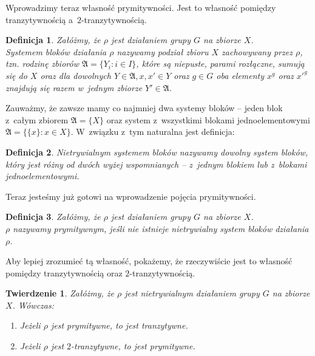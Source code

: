 \documentclass[licencjacka]{pracamgr}
\newtheorem{deff}{Definicja}[section]
\newtheorem{thh}{Twierdzenie}[section]
\begin{document}
Wprowadzimy teraz własność prymitywności. 
Jest to własność pomiędzy tranzytywnością a~$2$-tranzytywnością.

\begin{deff}
	Załóżmy, że $\rho$ jest działaniem grupy $G$ na zbiorze $X$. \\
	\emph{Systemem bloków} działania $\rho$ nazywamy podział zbioru $X$ zachowywany przez $\rho$,
	tzn. rodzinę zbiorów $\mathfrak{A} = \{Y_i \colon i \in I \}$, które są niepuste, parami rozłączne, sumują się do $X$ 
	oraz dla dowolnych $Y \in \mathfrak{A}, x, x' \in Y$ oraz $g \in G$ 
	oba elementy $x^g$ oraz $x'^g$ znajdują się razem w~jednym zbiorze $Y' \in \mathfrak{A}$.
\end{deff}

Zauważmy, że zawsze mamy co najmniej dwa systemy bloków -- jeden blok z~całym zbiorem $\mathfrak{A} = \{X\}$
oraz system z~wszystkimi blokami jednoelementowymi $\mathfrak{A} = \{\{x\} \colon x \in X\}$.
W~związku z~tym naturalna jest definicja:

\begin{deff}
	\emph{Nietrywialnym systemem bloków} nazywamy dowolny system bloków, 
	który jest różny od dwóch wyżej wspomnianych -- z~jednym blokiem lub z~blokami jednoelementowymi.
\end{deff}

Teraz jesteśmy już gotowi na wprowadzenie pojęcia prymitywności.

\begin{deff}
	Załóżmy, że $\rho$ jest działaniem grupy $G$ na zbiorze $X$. \\
	\emph{$\rho$ nazywamy prymitywnym}, jeśli nie istnieje nietrywialny system bloków działania $\rho$.
\end{deff}

Aby lepiej zrozumieć tą własność, pokażemy, że rzeczywiście jest to własność pomiędzy tranzytywnością oraz $2$-tranzytywnością.

\begin{thh}
	Załóżmy, że $\rho$ jest nietrywialnym działaniem grupy $G$ na zbiorze $X$. Wówczas:
	\begin{enumerate}[label=\alph*)]
	 \item Jeżeli $\rho$ jest prymitywne, to jest tranzytywne.
	 \item Jeżeli $\rho$ jest $2$-tranzytywne, to jest prymitywne.
	\end{enumerate}
\end{thh}
\end{document}
